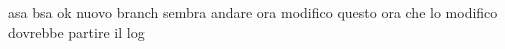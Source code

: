 \documentclass{article}
\begin{document}
asa
bsa
ok nuovo branch
sembra andare
ora modifico questo
ora che lo modifico dovrebbe partire il log
\end{document}

